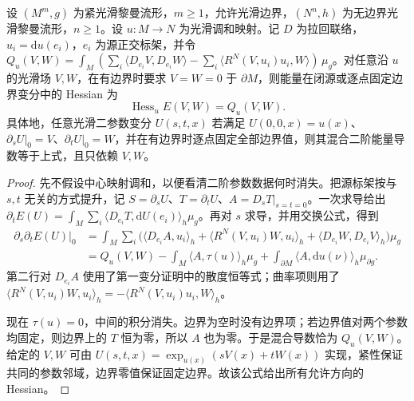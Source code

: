 \begin{theorem}\label{g3:thm:harmonic-map-second-variation}
	设 \((M^m,g)\) 为紧光滑黎曼流形，\(m\ge1\)，允许光滑边界，\((N^n,h)\) 为无边界光滑黎曼流形，\(n\ge1\)。设 \(u:M\to N\) 为光滑调和映射。记 \(D\) 为拉回联络，\(u_i=\mathrm du(e_i)\)，\(e_i\) 为源正交标架，并令 \(Q_u(V,W)=\int_M(\sum_i\langle D_{e_i}V,D_{e_i}W\rangle-\sum_i\langle R^N(V,u_i)u_i,W\rangle)\,\mu_g\)。对任意沿 \(u\) 的光滑场 \(V,W\)，在有边界时要求 \(V=W=0\) 于 \(\partial M\)，则能量在闭源或逐点固定边界变分中的 Hessian 为
	\begin{equation}\label{g3:eq:harmonic-map-second-variation}
		\operatorname{Hess}_uE(V,W)=Q_u(V,W).
	\end{equation}
	具体地，任意光滑二参数变分 \(U(s,t,x)\) 若满足 \(U(0,0,x)=u(x)\)、\(\partial_sU|_0=V\)、\(\partial_tU|_0=W\)，并在有边界时逐点固定全部边界值，则其混合二阶能量导数等于上式，且只依赖 \(V,W\)。
\end{theorem}
\begin{proof}
	先不假设中心映射调和，以便看清二阶参数数据何时消失。把源标架按与 \(s,t\) 无关的方式提升，记 \(S=\partial_sU\)、\(T=\partial_tU\)、\(A=D_sT|_{s=t=0}\)。一次求导给出
	\(\partial_tE(U)=\int_M\sum_i\langle D_{e_i}T,\mathrm dU(e_i)\rangle_h\mu_g\)。再对 \(s\) 求导，并用交换公式，得到
	\[
		\begin{aligned}
			\left.\partial_s\partial_tE(U)\right|_0
			&=\int_M\sum_i\bigl(\langle D_{e_i}A,u_i\rangle_h
			+\langle R^N(V,u_i)W,u_i\rangle_h
			+\langle D_{e_i}W,D_{e_i}V\rangle_h\bigr)\mu_g\\
			&=Q_u(V,W)-\int_M\langle A,\tau(u)\rangle_h\mu_g
			+\int_{\partial M}\langle A,\mathrm du(\nu)\rangle_h\mu_{\partial g}.
		\end{aligned}
	\]
	第二行对 \(D_{e_i}A\) 使用了第一变分证明中的散度恒等式；曲率项则用了
	\(\langle R^N(V,u_i)W,u_i\rangle_h=-\langle R^N(V,u_i)u_i,W\rangle_h\)。

	现在 \(\tau(u)=0\)，中间的积分消失。边界为空时没有边界项；若边界值对两个参数均固定，则边界上的 \(T\) 恒为零，所以 \(A\) 也为零。于是混合导数恰为 \(Q_u(V,W)\)。给定的 \(V,W\) 可由 \(U(s,t,x)=\exp_{u(x)}(sV(x)+tW(x))\) 实现，紧性保证共同的参数邻域，边界零值保证固定边界。故该公式给出所有允许方向的 Hessian。
\end{proof}

